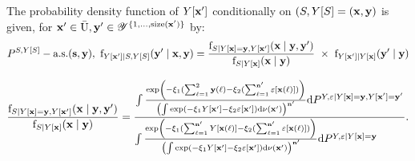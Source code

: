 \begin{property}
The probability density function of $Y[\mathbf{x}']$ conditionally on $(S,Y[S] =(\mathbf{x},\mathbf{y})$ is given, for $\mathbf{x}'\in\bar{\mathrm{U}},
\mathbf{y}'\in\mathscr{Y}^{\{1,\ldots,\mathrm{size}(\mathbf{x}')\}}$ by:
\begin{equation}
P^{S,Y[S]}-\text{a.s.}(\mathbf{s},\mathbf{y}),~ \mathrm{f}_{Y[\mathbf{x}']\mid S,Y[S]}(\mathbf{y}'\mid\mathbf{x},\mathbf{y})
=\frac{
\mathrm{f}_{S\mid Y[\mathbf{x}]=\mathbf{y},Y[\mathbf{x}']}(\mathbf{x}\mid\mathbf{y},\mathbf{y}')
}{
\mathrm{f}_{S\mid Y[\mathbf{x}]}(\mathbf{x}\mid\mathbf{y})
}~\times~\mathrm{f}_{Y[\mathbf{x}']\mid Y[\mathbf{x}]}(\mathbf{y}'\mid\mathbf{y})
\end{equation}
\end{property}
\begin{equation*}
\frac{
\mathrm{f}_{S\mid Y[\mathbf{x}]=\mathbf{y},Y[\mathbf{x}']}(\mathbf{x}\mid\mathbf{y},\mathbf{y}')
}{
\mathrm{f}_{S\mid Y[\mathbf{x}]}(\mathbf{x}\mid\mathbf{y})
}=
\frac{
\int 
\frac{\exp\left(-\xi_1(\sum_{\ell=1}^2\mathbf{y}(\ell)-\xi_2(\sum_{\ell=1}^{\mathbf{n}'}\varepsilon[\mathbf{x}(\ell)])\right)}{\left(\int \exp\left(-\xi_1Y[\mathbf{x}']-\xi_2\varepsilon[\mathbf{x}']\right)\mathrm{d}\nu(\mathbf{x}')\right)^{\mathbf{n}'}}\mathrm{d} P^{Y,\varepsilon\mid Y[\mathbf{x}]=\mathbf{y},Y[\mathbf{x}']=\mathbf{y}'} 
}{
\int 
\frac{\exp\left(-\xi_1(\sum_{\ell=1}^{\mathbf{n}'}Y[\mathbf{x}(\ell)]-\xi_2(\sum_{\ell=1}^{\mathbf{n}'}\varepsilon[\mathbf{x}(\ell)])\right)}{\left(\int \exp\left(-\xi_1Y[\mathbf{x}']-\xi_2\varepsilon[\mathbf{x}']\right)\mathrm{d}\nu(\mathbf{x}')\right)^{\mathbf{n}'}}\mathrm{d} P^{Y,\varepsilon\mid Y[\mathbf{x}]=\mathbf{y}} \phantom{11111} 
}.
\end{equation*}